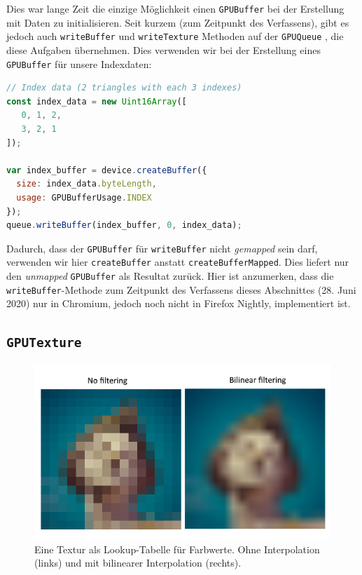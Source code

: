 \documentclass[oneside]{ausarbeitung}
\begin{document}
Dies war lange Zeit die einzige Möglichkeit einen \texttt{GPUBuffer} bei der Erstellung mit Daten zu initialisieren. Seit kurzem (zum Zeitpunkt des Verfassens), gibt es jedoch auch \texttt{writeBuffer} und \texttt{writeTexture} Methoden auf der \texttt{GPUQueue} \cite{github:write_buffer}, die diese Aufgaben übernehmen. Dies verwenden wir bei der Erstellung eines \texttt{GPUBuffer} für unsere Indexdaten:
\begin{lstlisting}[language=JavaScript]
// Index data (2 triangles with each 3 indexes)
const index_data = new Uint16Array([
   0, 1, 2, 
   3, 2, 1
]);

var index_buffer = device.createBuffer({
  size: index_data.byteLength,
  usage: GPUBufferUsage.INDEX
});
queue.writeBuffer(index_buffer, 0, index_data);
\end{lstlisting}

Dadurch, dass der \texttt{GPUBuffer} für \texttt{writeBuffer} nicht \textit{gemapped} sein darf, verwenden wir hier \texttt{createBuffer} anstatt \texttt{createBufferMapped}. Dies liefert nur den \textit{unmapped} \texttt{GPUBuffer} als Resultat zurück. Hier ist anzumerken, dass die \texttt{writeBuffer}-Methode zum Zeitpunkt des Verfassens dieses Abschnittes (28. Juni 2020) nur in Chromium, jedoch noch nicht in Firefox Nightly, implementiert ist.

\subsection{\texttt{GPUTexture}}

\begin{figure}
    \includegraphics[width=\textwidth]{images/texture_filtering.png}
    \caption{Eine Textur als Lookup-Tabelle für Farbwerte. Ohne Interpolation (links) und mit bilinearer Interpolation (rechts). \cite{vulkan_tutorial:texture_filtering}}
    \label{fig:texture_filtering}
\end{figure}
\end{document}
